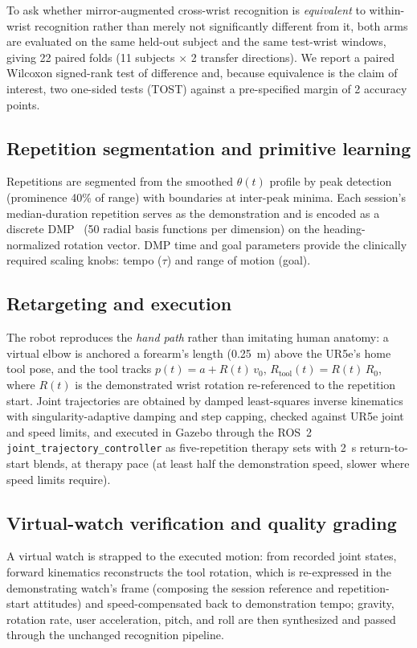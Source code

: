 \documentclass[conference]{IEEEtran}
\begin{document}
To ask whether mirror-augmented cross-wrist recognition is
\emph{equivalent} to within-wrist recognition rather than merely not
significantly different from it, both arms are evaluated on the same
held-out subject and the same test-wrist windows, giving 22 paired
folds (11 subjects $\times$ 2 transfer directions). We report a paired
Wilcoxon signed-rank test of difference and, because equivalence is
the claim of interest, two one-sided tests (TOST) against a
pre-specified margin of 2 accuracy points.

\subsection{Repetition segmentation and primitive learning}
Repetitions are segmented from the smoothed $\theta(t)$ profile by
peak detection (prominence 40\% of range) with boundaries at
inter-peak minima. Each session's median-duration repetition serves as
the demonstration and is encoded as a discrete
DMP~\cite{ijspeert2013} (50 radial basis functions per dimension) on
the heading-normalized rotation vector. DMP time and goal parameters
provide the clinically required scaling knobs: tempo ($\tau$) and
range of motion (goal).

\subsection{Retargeting and execution}
The robot reproduces the \emph{hand path} rather than imitating human
anatomy: a virtual elbow is anchored a forearm's length (0.25~m) above
the UR5e's home tool pose, and the tool tracks
$p(t) = a + R(t)\,v_0$, $R_{\mathrm{tool}}(t) = R(t)\,R_0$, where
$R(t)$ is the demonstrated wrist rotation re-referenced to the
repetition start. Joint trajectories are obtained by damped
least-squares inverse kinematics with singularity-adaptive damping and
step capping, checked against UR5e joint and speed limits, and
executed in Gazebo through the ROS~2
\texttt{joint\_trajectory\_controller} as five-repetition therapy sets
with 2~s return-to-start blends, at therapy pace (at least half the
demonstration speed, slower where speed limits require).

\subsection{Virtual-watch verification and quality grading}
A virtual watch is strapped to the executed motion: from recorded
joint states, forward kinematics reconstructs the tool rotation, which
is re-expressed in the demonstrating watch's frame (composing the
session reference and repetition-start attitudes) and
speed-compensated back to demonstration tempo; gravity, rotation rate,
user acceleration, pitch, and roll are then synthesized and passed
through the unchanged recognition pipeline.
\end{document}
